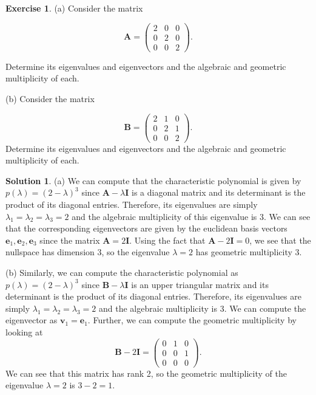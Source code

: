 \documentclass[12pt]{article}
\renewcommand{\vec}[1]{\mathbf{#1}}
\theoremstyle{definition}
\newtheorem{exer}{Exercise}
\newtheorem{sol}{Solution}
\theoremstyle{remark}
\begin{document}
\begin{exer}
    (a) Consider the matrix 

    \begin{equation*} 
    \vec{A} = \begin{pmatrix}
        2 & 0 & 0 \\
        0 & 2 & 0 \\
        0 & 0 & 2
    \end{pmatrix}.
    \end{equation*}

Determine its eigenvalues and eigenvectors and the algebraic and geometric multiplicity of each.

    (b) Consider the matrix 

    \begin{equation*} 
    \vec{B} = \begin{pmatrix}
        2 & 1 & 0 \\
        0 & 2 & 1 \\
        0 & 0 & 2
    \end{pmatrix}.
    \end{equation*}
Determine its eigenvalues and eigenvectors and the algebraic and geometric multiplicity of each.
\end{exer}

\begin{sol}\leavevmode

    (a) We can compute that the characteristic polynomial is given by $p(\lambda) = (2 - \lambda)^3$ since  $\vec{A}-\lambda \vec{I}$ is a diagonal matrix and its determinant is the product of its diagonal entries. Therefore, its eigenvalues are simply $\lambda_1 = \lambda_2 = \lambda_3 = 2$ and the algebraic multiplicity of this eigenvalue is 3. We can see that the corresponding eigenvectors are given by the euclidean basis vectors $\vec{e}_1, \vec{e}_2, \vec{e}_3$ since the matrix $\vec{A} = 2\vec{I}$. Using the fact that $\vec{A} - 2 \vec{I} = 0$, we see that the nullspace has dimension 3, so the eigenvalue $\lambda=2$ has geometric multiplicity 3.

        (b) Similarly, we can compute the characteristic polynomial as $p(\lambda) = (2-\lambda)^3$ since  $\vec{B}-\lambda \vec{I}$ is an upper triangular matrix and its determinant is the product of its diagonal entries. Therefore, its eigenvalues are simply $\lambda_1 = \lambda_2 = \lambda_3 = 2$ and the algebraic multiplicity is 3. We can compute the eigenvector as $\vec{v}_1 = \vec{e}_1$. Further, we can compute the geometric multiplicity by looking at 
\begin{equation*}
    \vec{B} - 2 \vec{I} = 
    \begin{pmatrix}
        0 & 1 & 0 \\
        0 & 0 & 1 \\
        0 & 0 & 0
    \end{pmatrix}.
\end{equation*}
We can see that this matrix has rank 2, so the geometric multiplicity of the eigenvalue $\lambda = 2$ is $3-2 = 1$.
\end{sol}
\end{document}
